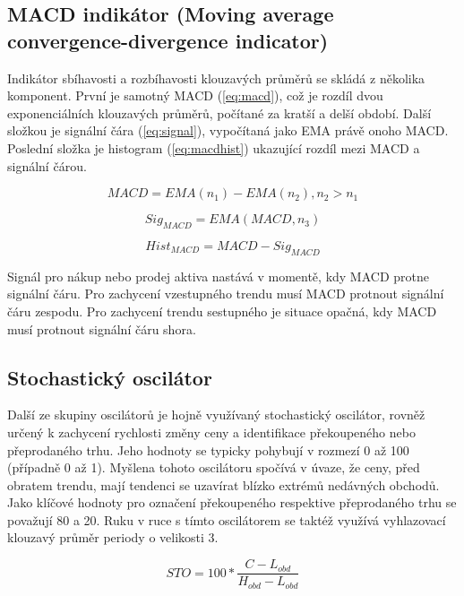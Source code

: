 \subsection{MACD indikátor (Moving average convergence-divergence indicator)}
Indikátor sbíhavosti a rozbíhavosti klouzavých průměrů se skládá z několika komponent. První je samotný MACD (\ref{eq:macd}), což je rozdíl dvou exponenciálních klouzavých průměrů, počítané
za kratší a delší období. Další složkou je signální čára (\ref{eq:signal}), vypočítaná jako EMA právě onoho MACD. Poslední složka je histogram (\ref{eq:macdhist})
ukazující rozdíl mezi MACD a signální čárou.

\begin{equation}
    MACD = EMA(n_1) - EMA(n_2), n_2 > n_1
    \label{eq:macd}
\end{equation}

\begin{equation}
    Sig_{MACD} = EMA(MACD, n_3)
    \label{eq:signal}
\end{equation}

\begin{equation}
    Hist_{MACD} = MACD - Sig_{MACD}
    \label{eq:macdhist}
\end{equation}

Signál pro nákup nebo prodej aktiva nastává v momentě, kdy MACD protne signální čáru. Pro zachycení vzestupného trendu musí MACD protnout signální čáru zespodu. Pro zachycení
trendu sestupného je situace opačná, kdy MACD musí protnout signální čáru shora. %

\subsection{Stochastický oscilátor}
Další ze skupiny oscilátorů je hojně využívaný stochastický oscilátor, rovněž určený k zachycení rychlosti změny ceny a identifikace překoupeného nebo přeprodaného trhu. Jeho
hodnoty se typicky pohybují v rozmezí 0 až 100 (případně 0 až 1). Myšlena tohoto oscilátoru spočívá v úvaze, že ceny, před obratem trendu, mají tendenci se uzavírat blízko extrémů
nedávných obchodů. Jako klíčové hodnoty pro označení překoupeného respektive přeprodaného trhu se považují 80 a 20. Ruku v ruce s tímto oscilátorem se taktéž využívá vyhlazovací
klouzavý průměr periody o velikosti 3.

\begin{equation}
    STO = 100 * \frac{C  - L_{obd}}{H_{obd} - L_{obd}}
    \label{eq:sto}
\end{equation}


